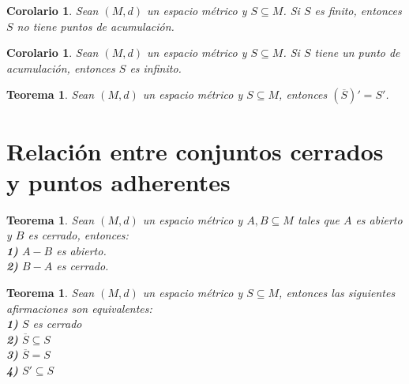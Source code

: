 \documentclass[oneside]{book} %
\theoremstyle{Teorema}
\newtheorem{Teorema}[Definicion]{Teorema}
\newtheorem{Corolario}[Definicion]{Corolario}
\theoremstyle{Ejemplos}
\theoremstyle{[Obs]}
\renewcommand{\{}{\left\lbrace} %
\renewcommand{\}}{\right\rbrace} %
\renewcommand{\sc}{\subseteq} %
\begin{document}
			\begin{Corolario}
				
				Sean $(M, d)$ un espacio métrico y $S \sc M$. Si $S$ es finito, entonces $S$ no tiene puntos de acumulación. \\

			\end{Corolario}

			\begin{Corolario}
				
				Sean $(M, d)$ un espacio métrico y $S \sc M$. Si $S$ tiene un punto de acumulación, entonces $S$ es infinito. \\

			\end{Corolario}

			\begin{Teorema}
				
				Sean $(M, d)$ un espacio métrico y $S \sc M$, entonces $(\overline{S})' = S'$. \\

			\end{Teorema}

		\section{Relación entre conjuntos cerrados y puntos adherentes}

			\begin{Teorema}
				
				Sean $(M, d)$ un espacio métrico y $A, B \sc M$ tales que $A$ es abierto y $B$ es cerrado, entonces: \\

				\textbf{1)} $A - B$ es abierto. \\

				\textbf{2)} $B - A$ es cerrado. \\

			\end{Teorema}

			\begin{Teorema}
				
				Sean $(M, d)$ un espacio métrico y $S \sc M$, entonces las siguientes afirmaciones son equivalentes: \\

				\textbf{1)} $S$ es cerrado \\

				\textbf{2)} $\overline{S} \sc S$ \\

				\textbf{3)} $\overline{S} = S$ \\

				\textbf{4)} $S' \sc S$ \\

			\end{Teorema}
\end{document}
